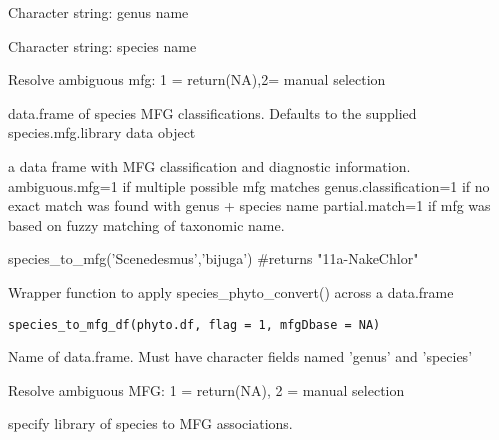 \documentclass[a4paper]{book}
\begin{document}
%
\begin{Arguments}
\begin{ldescription}
\item[\code{genus}] Character string: genus name

\item[\code{species}] Character string: species name

\item[\code{flag}] Resolve ambiguous mfg: 1 = return(NA),2= manual selection

\item[\code{mfgDbase}] data.frame of species MFG classifications. Defaults to the supplied species.mfg.library data object
\end{ldescription}
\end{Arguments}
%
\begin{Value}
a data frame with MFG classification and diagnostic information.
ambiguous.mfg=1 if multiple possible mfg matches
genus.classification=1 if no exact match was found with genus + species name
partial.match=1 if mfg was based on fuzzy matching of taxonomic name.
\end{Value}
%
\begin{Examples}
\begin{ExampleCode}
species_to_mfg('Scenedesmus','bijuga')
#returns "11a-NakeChlor"
\end{ExampleCode}
\end{Examples}
%
\begin{Description}\relax
Wrapper function to apply species\_phyto\_convert() across a data.frame
\end{Description}
%
\begin{Usage}
\begin{verbatim}
species_to_mfg_df(phyto.df, flag = 1, mfgDbase = NA)
\end{verbatim}
\end{Usage}
%
\begin{Arguments}
\begin{ldescription}
\item[\code{phyto.df}] Name of data.frame. Must have character fields named 'genus' and 'species'

\item[\code{flag}] Resolve ambiguous MFG: 1 = return(NA), 2 = manual selection

\item[\code{mfgDbase}] specify library of species to MFG associations.
\end{ldescription}
\end{Arguments}
\end{document}
